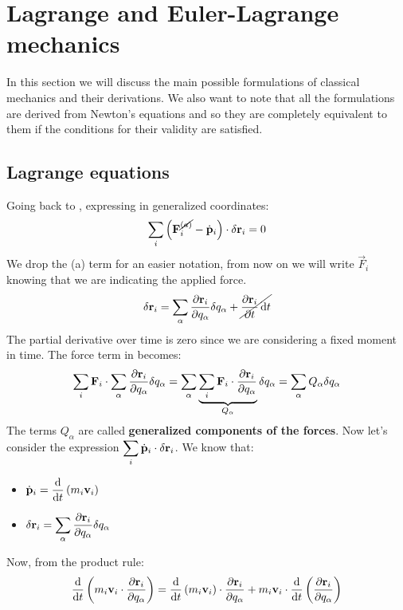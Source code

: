 \chapter{Lagrange and Euler-Lagrange mechanics}
In this section we will discuss the main possible formulations of classical mechanics and their derivations. We also want to note that all the formulations are derived from Newton's equations and so they are completely equivalent to them if the conditions for their validity are satisfied.
\section{Lagrange equations}
Going back to \dalembertref, expressing in generalized coordinates:
\begin{equation}
    \displaystyle\sum_i \left(\vb{F}^{\cancel{(a)}}_i - \dot{\vb{p}}_i\right) \cdot \delta \vb{r}_i = 0
\end{equation}
We drop the (a) term for an easier notation, from now on we will write $\vec{F}_i$ knowing that we are indicating the applied force.
\begin{equation}
    \delta \vb{r}_i = \displaystyle\sum_{\alpha} \dfrac{\partial \vb{r}_i}{\partial q_{\alpha}} \delta q_{\alpha} + \cancel{\dfrac{\partial \vb{r}_i}{\partial t} \dd{t}}
\end{equation}
The partial derivative over time is zero since we are considering a fixed moment in time. The force term in \dalembertref\;becomes:
\begin{equation}
    \displaystyle\sum_i \vb{F}_i \cdot \displaystyle\sum_{\alpha} \dfrac{\partial \vb{r}_i}{\partial q_{\alpha}} \delta q_{\alpha} = \displaystyle\sum_{\alpha}\underbrace{\displaystyle\sum_{i} \vb{F}_i \cdot \dfrac{\partial \vb{r}_i}{\partial q_{\alpha}}}_{Q_{\alpha}} \delta q_{\alpha} = \displaystyle\sum_{\alpha}Q_{\alpha}\delta q_{\alpha}
\end{equation}
The terms $Q_{\alpha}$ are called \textbf{generalized components of the forces}.
Now let's consider the expression $\displaystyle\sum_i \dot{\vb{p}}_i \cdot \delta \vb{r}_i$. We know that:
\begin{itemize}
    \item $\dvec{p}_i = \dv{}{t}\brackets{m_i\vec{v}_i}$
    \item $\delta \vb{r}_i = \displaystyle\sum_{\alpha} \dfrac{\partial \vb{r}_i}{\partial q_{\alpha}}\delta q_{\alpha}$
\end{itemize}
Now, from the product rule:
\begin{equation} \label{e:total_deriv}
    \dv{}{t}\brackets{m_i\vec{v}_i \cdot \dfrac{\partial \vec{r}_i}{\partial q_{\alpha}}} = \dv{}{t}\brackets{m_i\vec{v}_i}\cdot \dfrac{\partial \vec{r}_i}{\partial q_{\alpha}} + m_i\vec{v}_i \cdot \dv{}{t}\brackets{\dfrac{\partial \vec{r}_i}{\partial q_{\alpha}}}
\end{equation}
